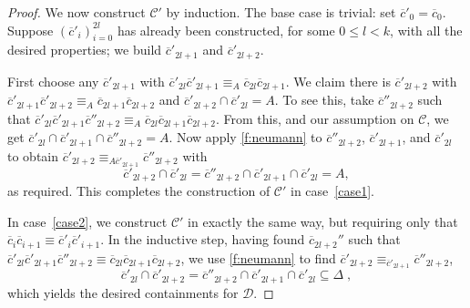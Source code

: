 \documentclass{article}
\theoremstyle{remark}
\theoremstyle{definition}
\newcommand{\C}[0]{\mathcal{C}}
\newcommand{\D}[0]{\mathcal{D}}
\renewcommand\leq{\leqslant}
\begin{document}
{{{{{\begin{proof}
{We now construct $\mathcal{C}'$ by induction. The base case is trivial: set $\overline{c}'_{0}=\overline{c}_{0}$. Suppose $(\overline{c}'_{i})_{i=0}^{2l}$ has already been constructed, for some $0\leq l<k$, with all the desired properties; we build $\overline{c}'_{2l+1}$ and $\overline{c}'_{2l+2}$.}

{First choose any $\overline{c}'_{2l+1}$ with $\overline{c}'_{2l}\overline{c}'_{2l+1}
\equiv_{A}
\overline{c}_{2l}\overline{c}_{2l+1}$. We claim there is $\overline{c}'_{2l+2}$ with $\overline{c}'_{2l+1}\overline{c}'_{2l+2}
\equiv_{A}
\overline{c}_{2l+1}\overline{c}_{2l+2}$
and
$\overline{c}'_{2l+2}\cap \overline{c}'_{2l}=A$. To see this, take $\overline{c}''_{2l+2}$ such that $\overline{c}'_{2l}\overline{c}'_{2l+1}
\overline{c}''_{2l+2}
\equiv_A
\overline{c}_{2l}\overline{c}_{2l+1}\overline{c}_{2l+2}$.
From this, and our assumption on $\C$, we get $\overline{c}'_{2l}\cap\overline{c}'_{2l+1}
\cap\overline{c}''_{2l+2}=A$. 
Now apply \cref{f:neumann} to
$\overline{c}''_{2l+2}$,
$\overline{c}'_{2l+1}$, and
$\overline{c}'_{2l}$ to obtain 
$\overline{c}'_{2l+2}\equiv_{A \overline{c}'_{2l+1}}
\overline{c}''_{2l+2}$ with}
\[
\overline{c}'_{2l+2}\cap \overline{c}'_{2l}
=
\overline{c}''_{2l+2}\cap
\overline{c}'_{2l+1}\cap
\overline{c}'_{2l}
=A,
\]
{as required. This completes the construction of $\C'$ in case~\ref{case1}.}

{In case~\ref{case2}, we construct $\C'$ in exactly the same way, but
requiring only that $\overline{c}_{i}\overline{c}_{i+1}
\equiv
\overline{c}'_{i}\overline{c}'_{i+1}$. In the inductive step, having found $\overline{c}_{2l+2}''$ such that $\overline{c}'_{2l}\overline{c}'_{2l+1}
\overline{c}''_{2l+2}
\equiv
\overline{c}_{2l}\overline{c}_{2l+1}\overline{c}_{2l+2}$, we use \cref{f:neumann} to
find $\overline{c}'_{2l+2}\equiv_{\overline{c}'_{2l+1}}
\overline{c}''_{2l+2}$,}
\[
\overline{c}'_{2l}\cap\overline{c}'_{2l+2}=\overline{c}''_{2l+2}\cap
\overline{c}'_{2l+1}\cap
\overline{c}'_{2l}\subseteq\Delta\;,
\]
{which yields the desired containments for $\D$.}
\end{proof}
  
   
  

  


    



 
 
 
}}}}}
\end{document}
